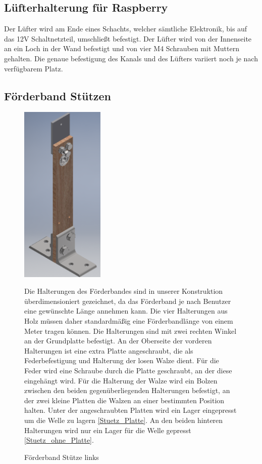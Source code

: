 \subsection{Lüfterhalterung für Raspberry}
Der Lüfter wird am Ende eines Schachts, welcher sämtliche Elektronik, bis auf das 12V Schaltnetzteil, umschließt befestigt. Der Lüfter wird von der Innenseite an ein Loch in der Wand befestigt und von vier M4 Schrauben mit Muttern gehalten. Die genaue befestigung des Kanals und des Lüfters variiert noch je nach verfügbarem Platz. \\
\subsection{Förderband Stützen}

\begin{figure}[H]
\begin{minipage}[t]{6cm}
\vspace{0pt}
\centering
\includegraphics[width=4cm]{Bilder/Inventor/Foerderband_Stuetze}
\caption{Förderband Stütze links}
\label{Foerd_stue}
\end{minipage}
\hfill
\begin{minipage}[t]{11cm}
\vspace{0pt}
Die Halterungen des Förderbandes sind in unserer Konstruktion überdimensioniert gezeichnet, da das Förderband je nach Benutzer eine gewünschte Länge annehmen kann. Die vier Halterungen aus Holz müssen daher standardmäßig eine Förderbandlänge von einem Meter tragen können. Die Halterungen sind mit zwei rechten Winkel an der Grundplatte befestigt. An der Oberseite der vorderen Halterungen ist eine extra Platte angeschraubt, die als Federbefestigung und Halterung der losen Walze dient. Für die Feder wird eine Schraube durch die Platte geschraubt, an der diese eingehängt wird. Für die Halterung der Walze wird ein Bolzen zwischen den beiden gegenüberliegenden Halterungen befestigt, an der zwei kleine Platten die Walzen an einer bestimmten Position halten. Unter der angeschraubten Platten wird ein Lager eingepresst um die Welle zu lagern \ref{Stuetz_Platte}.  An den beiden hinteren Halterungen wird nur ein Lager für die Welle gepresst \ref{Stuetz_ohne_Platte}.
\end{minipage}
\end{figure}
